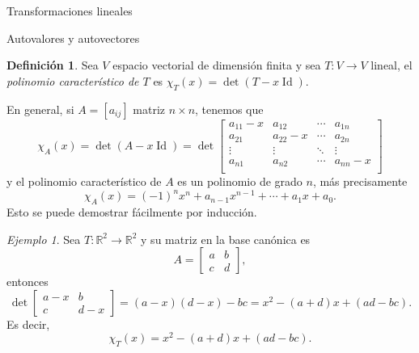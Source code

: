 \documentclass[a4paper,12pt,twoside,spanish,reqno]{amsbook}
\numberwithin{equation}{section}
\theoremstyle{definition}
\newtheorem{definicion}[teorema]{Definici\'on}
\theoremstyle{remark}
\newtheorem*{ejemplo*}{Ejemplo}
\newcommand{\Id}{\operatorname{Id}}
\newcommand{\R}{\mathbb R}
\begin{document}
\begin{chapter}{Transformaciones lineales}
\begin{section}{Autovalores y autovectores}
\begin{definicion}
            Sea $V$ espacio vectorial de dimensión finita y sea $T: V \to V$ lineal, el  \textit{polinomio característico de $T$} es $\chi_T(x) = \det(T- x \Id)$.
        \end{definicion}
    
            
        En general,  si $A = [a_{ij}]$ matriz $n \times n$, tenemos que
        \begin{equation}
        \chi_A(x) = \det(A- x\Id) = \det
        \begin{bmatrix}
        a_{11}-x&a_{12}&\cdots&a_{1n}\\
        a_{21}&a_{22}-x&\cdots&a_{2n}\\
        \vdots&\vdots&\ddots&\vdots\\
        a_{n1}&a_{n2}&\cdots&a_{nn}-x\\
        \end{bmatrix}
        \end{equation} 
        y el polinomio característico de $A$ es un polinomio  de grado $n$,  más precisamente  
        $$
        \chi_A(x) =(-1)^nx^n + a_{n-1}x^{n-1}+ \cdots + a_1x + a_0.
        $$ 
        Esto se puede demostrar fácilmente por inducción. 
        
        \begin{ejemplo*}
            Sea $T: \R^2 \to \R^2$ y su matriz en la base canónica es
            \begin{equation*}
                A = \begin{bmatrix}
                    a&b\\c&d
                \end{bmatrix},
            \end{equation*}
        entonces
        \begin{equation*}
                 \det \begin{bmatrix}
                a-x & b \\ c &d-x
                \end{bmatrix} = 
                (a-x)(d-x) - bc = x^2 -(a+d)x + (ad -bc).
        \end{equation*}
        Es decir,
        $$
        \chi_T(x) = x^2 -(a+d)x + (ad -bc).
        $$ 
        \end{ejemplo*}

    
    

\end{section}
\end{chapter}
\end{document}
